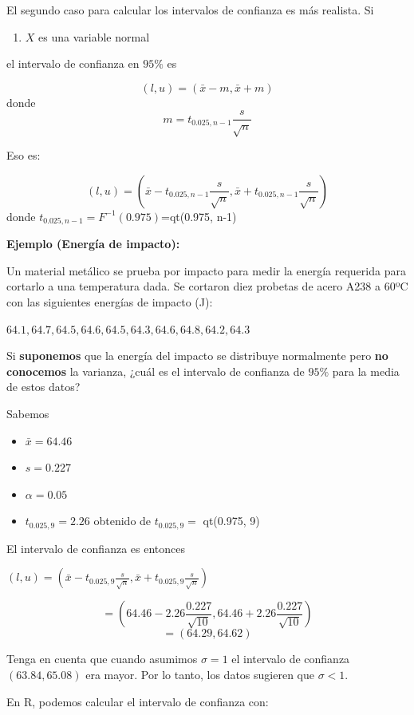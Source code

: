 \documentclass[
]{book}
\providecommand{\tightlist}{%
  \setlength{\itemsep}{0pt}\setlength{\parskip}{0pt}}
\begin{document}
El segundo caso para calcular los intervalos de confianza es más realista. Si

\begin{enumerate}
\def\labelenumi{\arabic{enumi}.}
\tightlist
\item
  \(X\) es una variable normal
\end{enumerate}

el intervalo de confianza en \(95\%\) es

\[(l,u)=(\bar{x} - m, \bar{x} + m)\]
donde \[m=t_{0.025, n-1} \frac{s}{\sqrt{n}}\]

Eso es:

\[(l,u)=(\bar{x} - t_{0.025, n-1} \frac{s}{\sqrt{n}}, \bar{x} + t_{0.025, n-1} \frac{s}{\sqrt{n}})\]
donde \(t_{0.025, n-1}=F^{-1}(0.975)\)=qt(0.975, n-1)

\textbf{Ejemplo (Energía de impacto):}

Un material metálico se prueba por impacto para medir la energía requerida para cortarlo a una temperatura dada. Se cortaron diez probetas de acero A238 a 60ºC con las siguientes energías de impacto (J):

\(64.1, 64.7, 64.5, 64.6, 64.5, 64.3, 64.6, 64.8, 64.2, 64.3\)

Si \textbf{suponemos} que la energía del impacto se distribuye normalmente pero \textbf{no conocemos} la varianza, ¿cuál es el intervalo de confianza de \(95\%\) para la media de estos datos?

Sabemos

\begin{itemize}
\tightlist
\item
  \(\bar{x}=64.46\)
\item
  \(s=0.227\)
\item
  \(\alpha=0.05\)
\item
  \(t_{0.025,9}=2.26\) obtenido de \(t_{0.025,9}=\) qt(0.975, 9)
\end{itemize}

El intervalo de confianza es entonces

\((l,u)=(\bar{x}- t_{0.025,9}\frac{s}{\sqrt{n}},\bar{x}+t_{0.025,9} \frac{s} {\sqrt{n}})\)

\[=(64.46-2.26 \frac{0.227}{\sqrt{10}},64.46+2.26 \frac{0.227}{\sqrt{10}})\] \[=(64.29,64.62)\]

Tenga en cuenta que cuando asumimos \(\sigma=1\) el intervalo de confianza \((63.84,65.08)\) era mayor. Por lo tanto, los datos sugieren que \(\sigma<1\).

En R, podemos calcular el intervalo de confianza con:
\end{document}
